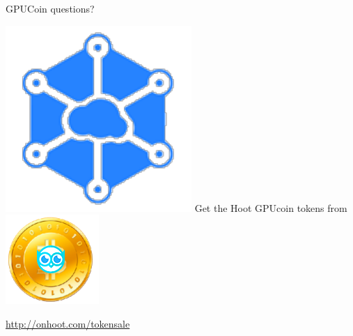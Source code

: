 \documentclass[10pt,handout]{beamer}
\begin{document}
\begin{frame}[standout]{GPUCoin questions?}

\includegraphics[scale=.5]{static/ipcn-p2p}
Get the Hoot GPUcoin tokens from
\includegraphics[scale=0.5]{static/hootcoin} 
 \begin{center}\url{http://onhoot.com/tokensale}\end{center}


 \begin{center}\ccbysa\end{center}

\end{frame}



 
 



% 	
\end{document}
